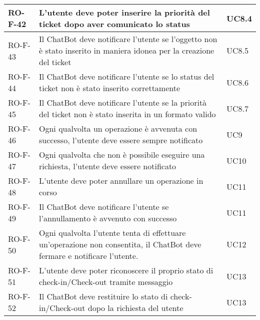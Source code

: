 \begin{center}
\begin{tabular}{ | m{8em} | m{18em} | m{12em} | }
\hline
RO-F-42&L’utente deve poter inserire la priorità del ticket dopo aver comunicato lo status &UC8.4 \\
\hline
RO-F-43&Il ChatBot deve notificare l’utente se l’oggetto non è stato inserito in maniera idonea per la creazione del ticket  &UC8.5 \\
\hline
RO-F-44&Il ChatBot deve notificare l’utente se lo status del ticket non è stato inserito correttamente  &UC8.6 \\
\hline
RO-F-45&Il ChatBot deve notificare l’utente se la priorità del ticket non è stato inserita in un formato valido &UC8.7 \\
\hline
RO-F-46&Ogni qualvolta un operazione è avvenuta con successo, l’utente deve essere sempre notificato &UC9 \\
\hline
RO-F-47&Ogni qualvolta che non è possibile eseguire una richiesta, l’utente deve essere notificato &UC10 \\
\hline
RO-F-48&L’utente deve poter annullare un operazione in corso &UC11 \\
\hline
RO-F-49&Il ChatBot deve notificare l’utente se l’annullamento è avvenuto con successo &UC11 \\
\hline
RO-F-50&Ogni qualvolta l’utente tenta di effettuare un’operazione non consentita, il ChatBot deve fermare e notificare l'utente.&UC12 \\
\hline
RO-F-51&L’utente deve poter riconoscere il proprio stato di check-in/Check-out tramite messaggio &UC13 \\
\hline
RO-F-52&Il ChatBot deve restituire lo stato di check-in/Check-out dopo la richiesta del utente &UC13\\
\hline
\end{tabular}
\newpage


\end{center}
